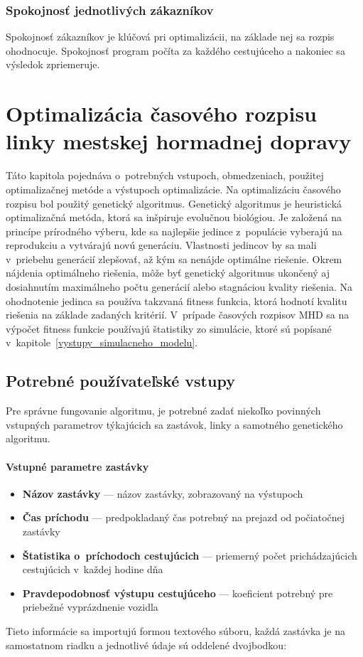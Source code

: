 \subsection*{Spokojnosť jednotlivých zákazníkov}
Spokojnosť zákazníkov je klúčová pri optimalizácii, na základe nej sa rozpis ohodnocuje.
Spokojnosť program počíta za každého cestujúceho a nakoniec sa výsledok zpriemeruje.

\chapter{Optimalizácia časového rozpisu linky mestskej hormadnej dopravy}\label{optimalizacia}

Táto kapitola pojednáva o~potrebných vstupoch, obmedzeniach, použitej optimalizačnej metóde a výstupoch optimalizácie.
Na optimalizáciu časového rozpisu bol použitý genetický algoritmus.
Genetický algoritmus je heuristická optimalizačná metóda, ktorá sa inšpiruje evolučnou biológiou.
Je založená na princípe prírodného výberu, kde sa najlepšie jedince z~populácie vyberajú na reprodukciu a vytvárajú novú generáciu.
Vlastnosti jedincov by sa mali v~priebehu generácií zlepšovať, až kým sa nenájde optimálne riešenie.
Okrem nájdenia optimálneho riešenia, môže byť genetický algoritmus ukončený aj dosiahnutím maximálneho počtu generácií alebo stagnáciou kvality riešenia.
Na ohodnotenie jedinca sa používa takzvaná fitness funkcia, ktorá hodnotí kvalitu riešenia na základe zadaných kritérií.
V~prípade časových rozpisov MHD sa na výpočet fitness funkcie používajú štatistiky zo simulácie, ktoré sú popísané v~kapitole~\ref{vystupy_simulacneho_modelu}.

\section{Potrebné používateľské vstupy}\label{vstupy_pouzivatela}
Pre správne fungovanie algoritmu, je potrebné zadať niekoľko povinných vstupných parametrov týkajúcich sa zastávok, linky a samotného genetického algoritmu.

\subsubsection{Vstupné parametre zastávky}
\begin{itemize}
  \item \textbf{Názov zastávky} --- názov zastávky, zobrazovaný na výstupoch
  \item \textbf{Čas príchodu} --- predpokladaný čas potrebný na prejazd od počiatočnej zastávky
  \item \textbf{Štatistika o~príchodoch cestujúcich} --- priemerný počet prichádzajúcich cestujúcich v~každej hodine dňa
  \item \textbf{Pravdepodobnosť výstupu cestujúceho} --- koeficient potrebný pre priebežné vyprázdnenie vozidla
\end{itemize}
Tieto informácie sa importujú formou textového súboru, každá zastávka je na samostatnom riadku a jednotlivé údaje sú oddelené dvojbodkou:

